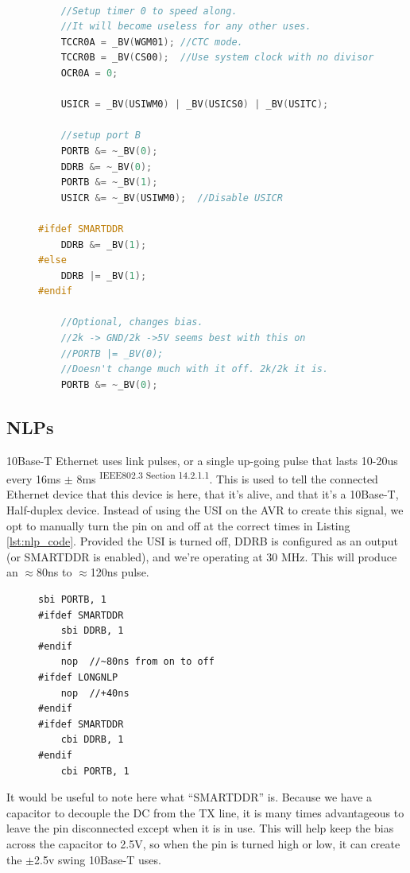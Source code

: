 \documentclass[13pt]{ltxdoc}
\begin{document}
\begin{figure}
\begin{lstlisting}[caption=USI Setup\label{lst:usisetup},language=C, frame=single]

	//Setup timer 0 to speed along.
	//It will become useless for any other uses.
	TCCR0A = _BV(WGM01); //CTC mode.
	TCCR0B = _BV(CS00);  //Use system clock with no divisor.
	OCR0A = 0;

	USICR = _BV(USIWM0) | _BV(USICS0) | _BV(USITC);

	//setup port B
	PORTB &= ~_BV(0); 
	DDRB &= ~_BV(0);
	PORTB &= ~_BV(1);
	USICR &= ~_BV(USIWM0);  //Disable USICR

#ifdef SMARTDDR
	DDRB &= _BV(1);
#else
	DDRB |= _BV(1);
#endif

	//Optional, changes bias.
	//2k -> GND/2k ->5V seems best with this on
	//PORTB |= _BV(0);
	//Doesn't change much with it off. 2k/2k it is.
	PORTB &= ~_BV(0);

\end{lstlisting}
\end{figure}


\subsection{NLPs}
10Base-T Ethernet uses link pulses, or a single up-going pulse that lasts 10-20us
every 16ms $\pm$ 8ms \textsuperscript{IEEE802.3 Section 14.2.1.1}.  This is used to tell
the connected Ethernet device that this device is here, that it's alive, and that it's a
10Base-T, Half-duplex device.  Instead of using the USI on the AVR to create this
signal, we opt to manually turn the pin on and off at the correct times in
Listing \ref{lst:nlp_code}.  Provided the USI is turned off, DDRB is configured as
an output (or SMARTDDR is enabled), and we're operating at 30 MHz.  This will produce an $\approx$80ns to $\approx$120ns pulse.

\begin{figure}
\begin{lstlisting}[caption=NLP Code\label{lst:nlp_code}, frame=single]
	sbi PORTB, 1
#ifdef SMARTDDR
	sbi DDRB, 1
#endif
	nop  //~80ns from on to off
#ifdef LONGNLP 
	nop  //+40ns
#endif
#ifdef SMARTDDR
	cbi DDRB, 1
#endif
	cbi PORTB, 1
\end{lstlisting}
\end{figure}

It would be useful to note here what ``SMARTDDR'' is.  Because we have a capacitor to decouple the DC from the TX line,
it is many times advantageous to leave the pin disconnected except when it is in use.  This will help keep the bias
across the capacitor to 2.5V, so when the pin is turned high or low, it can create the $\pm$2.5v swing 10Base-T uses.
\end{document}
